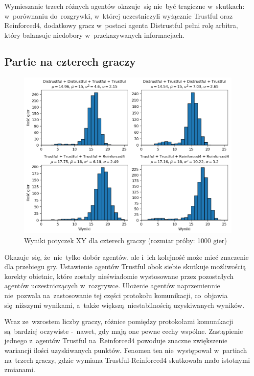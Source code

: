 \documentclass[declaration,shortabstract,inz]{iithesis}
\begin{document}
Wymieszanie trzech różnych agentów okazuje~się nie~być tragiczne w~skutkach: w~porównaniu do~rozgrywki, w~której uczestniczyli wyłącznie Trustful oraz Reinforced4, dodatkowy gracz w~postaci agenta Distrustful pełni rolę arbitra, który balansuje niedobory w~przekazywanych informacjach.

\subsection*{Partie na czterech graczy}

\begin{figure}[H]
	\centering
	\captionsetup{format=hang}
	\includegraphics[width=\textwidth,height=\textheight,keepaspectratio]{XY4.png}
	\caption[Caption]{Wyniki potyczek XY dla czterech graczy (rozmiar próby: 1000 gier)}
	\label{fig:XY4}
\end{figure}

Okazuje~się, że~nie~tylko dobór agentów, ale i~ich kolejność może mieć znaczenie dla przebiegu gry. Ustawienie agentów Trustful obok siebie skutkuje możliwością korekty obietnic, które zostały nieświadomie wystosowane przez pozostałych agentów uczestniczących w~rozgrywce. Ułożenie agentów naprzemiennie nie~pozwala na~zastosowanie tej części protokołu komunikacji, co~objawia się~niższymi wynikami, a~także większą niestabilnością uzyskiwanych wyników.

Wraz ze~wzrostem liczby graczy, różnice pomiędzy protokołami komunikacji są~bardziej oczywiste -~nawet, gdy mają one pewne cechy wspólne. Zastąpienie jednego z~agentów Trustful na~Reinforced4 powoduje znaczne zwiększenie wariancji ilości uzyskiwanych punktów. Fenomen ten nie~występował w~partiach na~trzech graczy, gdzie wymiana Trustful-Reinforced4 skutkowała mało istotnymi zmianami.
\end{document}
